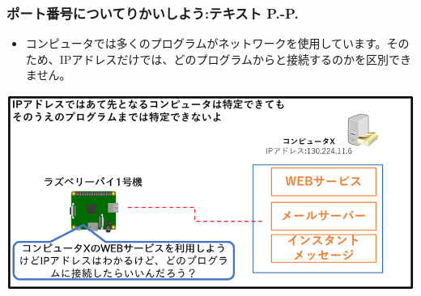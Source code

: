 \documentclass[dvipdfmx]{beamer}
\begin{document}
\begin{frame}[fragile]
	\frametitle{\large{ポート番号についてりかいしよう:テキスト P.\pageref{1:P:port}-P.\pageref{1:P:DNS}}~~~}
            \begin{itemize}
                \item コンピュータでは多くのプログラムがネットワークを使用しています。そのため、IPアドレスだけでは、どのプログラムからと接続するのかを区別できません。
            \end{itemize}
            
			\begin{minipage}{\textwidth}
                {\upshape
                  \includegraphics[width=\textwidth]{slide07-img011.png}}
            \end{minipage}
\end{frame}
\end{document}
